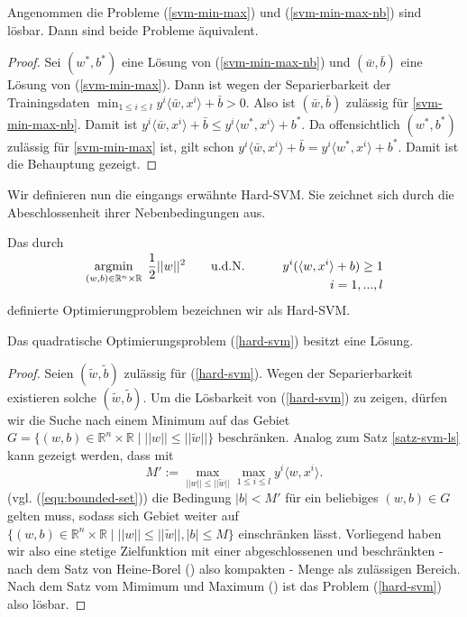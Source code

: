 \begin{lemma}
	\label{lemma-svm-minmax-equ}
	Angenommen die Probleme (\ref{svm-min-max}) und (\ref{svm-min-max-nb}) sind lösbar. Dann sind beide Probleme äquivalent.
\end{lemma}
\begin{proof}
	Sei $(w^*,b^*)$ eine Lösung von (\ref{svm-min-max-nb}) und $(\bar{w},\bar{b})$ eine Lösung von (\ref{svm-min-max}).
	Dann ist wegen der Separierbarkeit der Trainingsdaten $\min_{1\leq i \leq l}{y^i\langle \bar{w}, x^i \rangle + \bar{b}} > 0$. Also ist $(\bar{w},\bar{b})$ zulässig für \ref{svm-min-max-nb}. Damit ist $y^i\langle \bar{w}, x^i \rangle + \bar{b} \leq y^i\langle w^*, x^i \rangle + b^*$. Da offensichtlich $(w^*,b^*)$ zulässig für \ref{svm-min-max} ist, gilt schon $y^i\langle \bar{w}, x^i \rangle + \bar{b} = y^i\langle w^*, x^i \rangle + b^*$. Damit ist die Behauptung gezeigt.
\end{proof}

Wir definieren nun die eingangs erwähnte Hard-SVM. Sie zeichnet sich durch die Abeschlossenheit ihrer Nebenbedingungen aus.
\begin{definition}
	Das durch
	\begin{equation}
	\label{hard-svm}
	\begin{aligned}
		& \smash{\operatorname*{argmin}_{(w,b) \in \mathbb{R}^n \times \mathbb{R}}{ \; \frac{1}{2}||w||^2}} \qquad
		\text{u.d.N.} \qquad & 
		y^i(\langle w, x^i \rangle + b) \geq 1 \\
		&& i = 1,...,l
	\end{aligned}
	\end{equation}
	definierte Optimierungproblem bezeichnen wir als Hard-SVM.
\end{definition}

\begin{lemma}
	\label{lemma-hard-svm-loes}
	Das quadratische Optimierungsproblem (\ref{hard-svm}) besitzt eine Lösung.
\end{lemma}
\begin{proof}
Seien $(\tilde{w}, \tilde{b})$ zulässig für (\ref{hard-svm}). Wegen der Separierbarkeit  existieren solche $(\tilde{w},\tilde{b})$. Um die Lösbarkeit von (\ref{hard-svm}) zu zeigen, dürfen wir die Suche nach einem Minimum auf das Gebiet 
$G = \{ (w, b) \in \mathbb{R}^n \times \mathbb{R} \mid ||w|| \leq || \tilde{w}|| \}$ 
beschränken. 
Analog zum Satz \ref{satz-svm-ls} kann gezeigt werden, dass mit
$$
	M' := \max_{||w|| \leq || \tilde{w}||}{\max_{1 \leq i \leq l}{y^i \langle w, x^i \rangle}}.
$$
(vgl. (\ref{equ:bounded-set})) die Bedingung $|b| < M'$ für ein beliebiges $(w,b) \in G$ gelten muss, sodass sich Gebiet weiter auf  $\{ (w, b) \in \mathbb{R}^n \times \mathbb{R} \mid ||w|| \leq ||\tilde{w}||, |b| \leq M \}$ einschränken lässt. Vorliegend haben wir also eine stetige Zielfunktion mit einer abgeschlossenen und beschränkten - nach dem Satz von Heine-Borel (\cite{ae-ana1}) also kompakten - Menge als zulässigen Bereich. Nach dem Satz vom Mimimum und Maximum (\cite{ae-ana1}) ist das Problem (\ref{hard-svm}) also lösbar.
\end{proof}

